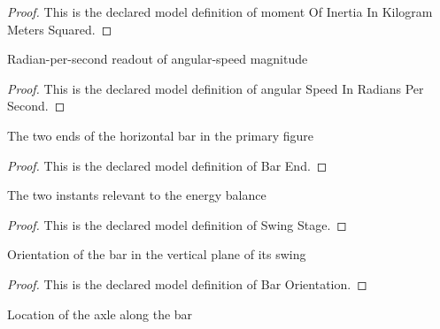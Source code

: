 \begin{proof}
  This is the declared model definition of moment Of Inertia In Kilogram Meters Squared.
\end{proof}
\begin{definition}
  \label{def:physics:phyx-mini-0782:phyxminiproblems-problemphyxmini0782-angularspeedinradianspersecond}
  Radian-per-second readout of angular-speed magnitude
\end{definition}
\begin{proof}
  This is the declared model definition of angular Speed In Radians Per Second.
\end{proof}
\begin{definition}
  \label{def:physics:phyx-mini-0782:phyxminiproblems-problemphyxmini0782-barend}
  The two ends of the horizontal bar in the primary figure
\end{definition}
\begin{proof}
  This is the declared model definition of Bar End.
\end{proof}
\begin{definition}
  \label{def:physics:phyx-mini-0782:phyxminiproblems-problemphyxmini0782-swingstage}
  The two instants relevant to the energy balance
\end{definition}
\begin{proof}
  This is the declared model definition of Swing Stage.
\end{proof}
\begin{definition}
  \label{def:physics:phyx-mini-0782:phyxminiproblems-problemphyxmini0782-barorientation}
  Orientation of the bar in the vertical plane of its swing
\end{definition}
\begin{proof}
  This is the declared model definition of Bar Orientation.
\end{proof}
\begin{definition}
  \label{def:physics:phyx-mini-0782:phyxminiproblems-problemphyxmini0782-axlelocation}
  Location of the axle along the bar
\end{definition}
